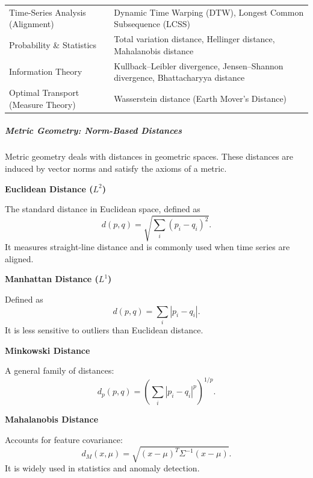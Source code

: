 \documentclass{book}
\providecommand{\ProjectDeepHeading}[2]{%
    \par\medskip\noindent\textbf{#2}\par\smallskip
}
\begin{document}
\begin{minipage}{\textwidth}
\begin{center}
\begin{tabular}{>{\raggedright\arraybackslash}p{5cm} p{9cm}}
                    Time-Series Analysis (Alignment) &
                    Dynamic Time Warping (DTW), Longest Common Subsequence (LCSS) \\
                    
                    Probability \& Statistics &
                    Total variation distance, Hellinger distance, Mahalanobis distance \\
                    
                    Information Theory &
                    Kullback--Leibler divergence, Jensen--Shannon divergence, Bhattacharyya distance \\
                    
                    Optimal Transport (Measure Theory) &
                    Wasserstein distance (Earth Mover's Distance) \\
                    \bottomrule
                \end{tabular}
            \end{center}
        
        
        \subparagraph*{Metric Geometry: Norm-Based Distances}
            Metric geometry deals with distances in geometric spaces. These distances are induced by vector norms and satisfy the axioms of a metric.
            
            \ProjectDeepHeading{1}{Euclidean Distance ($L^2$)}
                The standard distance in Euclidean space, defined as
                \[
                    d(p,q) = \sqrt{\sum_i (p_i - q_i)^2}.
                \]
                It measures straight-line distance and is commonly used when time series are aligned.
            
            \ProjectDeepHeading{1}{Manhattan Distance ($L^1$)}
                Defined as
                \[
                    d(p,q) = \sum_i |p_i - q_i|.
                \]
                It is less sensitive to outliers than Euclidean distance.
            
            \ProjectDeepHeading{1}{Minkowski Distance}
                A general family of distances:
                \[
                    d_p(p,q) = \left( \sum_i |p_i - q_i|^p \right)^{1/p}.
                \]
            
            \ProjectDeepHeading{1}{Mahalanobis Distance}
                Accounts for feature covariance:
                \[
                    d_M(x,\ensuremath{\mu}) = \sqrt{(x-\ensuremath{\mu})^T \ensuremath{\Sigma}^{-1} (x-\ensuremath{\mu})}.
                \]
                It is widely used in statistics and anomaly detection.
            

\end{minipage}
\end{document}
